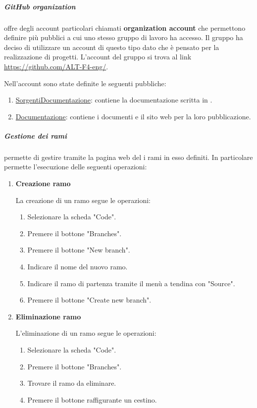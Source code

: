 \subparagraph{GitHub organization}
 offre degli account particolari chiamati \textbf{organization account} che permettono definire più  pubblici a cui uno stesso gruppo di lavoro ha accesso.
Il gruppo ha deciso di utilizzare un account di questo tipo dato che è pensato per la realizzazione di progetti.
L'account del gruppo si trova al link \href{https://github.com/ALT-F4-eng/}{https://github.com/ALT-F4-eng/}.

Nell'account sono state definite le seguenti  pubbliche:
\begin{enumerate}
    \item \href{https://github.com/ALT-F4-eng/SorgentiDocumentazione}{SorgentiDocumentazione}: contiene la documentazione scritta in .
    \item \href{https://github.com/ALT-F4-eng/Documentazione}{Documentazione}: contiene i documenti  e il sito web per la loro pubblicazione.
\end{enumerate}

\subparagraph{Gestione dei rami}
 permette di gestire tramite la pagina web del  i rami in esso definiti.
In particolare permette l'esecuzione delle seguenti operazioni:
\begin{enumerate}
    \item \textbf{Creazione ramo}
    
    La creazione di un ramo segue le operazioni:
    \begin{enumerate}
        \item Selezionare la scheda "Code".
        \item Premere il bottone "Branches".
        \item Premere il bottone "New branch".
        \item Indicare il nome del nuovo ramo.
        \item Indicare il ramo di partenza tramite il menù a tendina con  "Source".
        \item Premere il bottone "Create new branch".
    \end{enumerate}

    \item \textbf{Eliminazione ramo}
    
    L'eliminazione di un ramo segue le operazioni:
    \begin{enumerate}
        \item Selezionare la scheda "Code".
        \item Premere il bottone "Branches".
        \item Trovare il ramo da eliminare.
        \item Premere il bottone raffigurante un cestino.
    \end{enumerate}

\end{enumerate}

